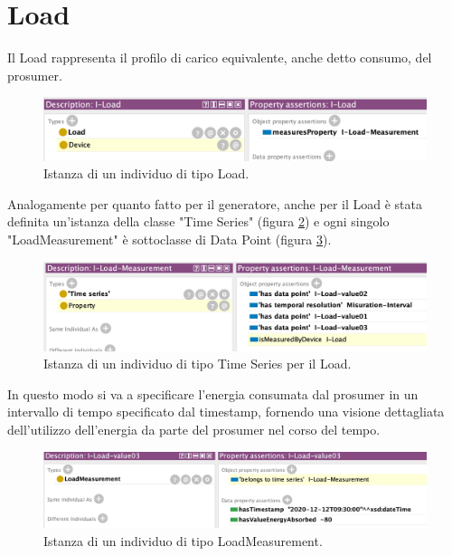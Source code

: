 \section{Load}
Il Load rappresenta il profilo di carico equivalente, anche detto consumo, del prosumer.
\begin{figure}[H]
    \centering
    \includegraphics[width=12cm]{images/individual_load.png}
    \caption{Istanza di un individuo di tipo Load.}
    \label{fig:individual_load}
\end{figure}
Analogamente per quanto fatto per il generatore, anche per il Load è stata definita un'istanza della classe "Time Series" (figura \ref{fig:individual_loadmes}) e ogni singolo "LoadMeasurement"
è sottoclasse di Data Point (figura \ref{fig:individual_loadval3}).
\begin{figure}[H]
    \centering
    \includegraphics[width=12cm]{images/individual_loadmes.png}
    \caption{Istanza di un individuo di tipo Time Series per il Load.}
    \label{fig:individual_loadmes}
\end{figure}
In questo modo si va a specificare l'energia consumata dal prosumer in un intervallo di tempo specificato dal timestamp, fornendo una visione dettagliata dell'utilizzo dell'energia da parte del prosumer nel corso del tempo.
\begin{figure}[H]
    \centering
    \includegraphics[width=12cm]{images/individual_loadval3.png}
    \caption{Istanza di un individuo di tipo LoadMeasurement.}
    \label{fig:individual_loadval3}
\end{figure}

